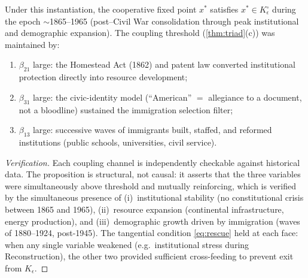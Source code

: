 \begin{proposition}\label{prop:american-fp}
Under this instantiation, the cooperative fixed point $x^*$
satisfies $x^* \in K_\epsilon^\circ$ during the epoch
$\sim$1865--1965 (post--Civil War consolidation through peak
institutional and demographic expansion).
The coupling threshold
(\cref{thm:triad}(c)) was maintained by:
\begin{enumerate}[label=(\roman*)]
  \item $\beta_{21}$ large: the Homestead Act (1862) and
    patent law converted institutional protection directly into
    resource development;
  \item $\beta_{31}$ large: the civic-identity model
    (``American'' $=$ allegiance to a document, not a bloodline)
    sustained the immigration selection filter;
  \item $\beta_{13}$ large: successive waves of immigrants
    built, staffed, and reformed institutions (public schools,
    universities, civil service).
\end{enumerate}
\end{proposition}

\begin{proof}[Verification]
Each coupling channel is independently checkable against
historical data.  The proposition is structural, not causal:
it asserts that the three variables were simultaneously above
threshold and mutually reinforcing, which is verified by the
simultaneous presence of (i)~institutional stability (no
constitutional crisis between 1865 and 1965), (ii)~resource
expansion (continental infrastructure, energy production), and
(iii)~demographic growth driven by immigration
(waves of 1880--1924, post-1945).
The tangential condition \eqref{eq:rescue} held at each face:
when any single variable weakened (e.g.\ institutional stress
during Reconstruction), the other two provided sufficient
cross-feeding to prevent exit from $K_\epsilon$.
\end{proof}

